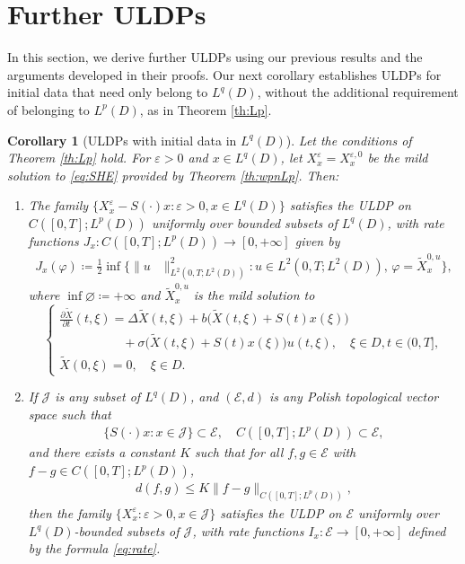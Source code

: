 \documentclass{amsart}
\theoremstyle{plain}
\theoremstyle{remark}
\theoremstyle{plain}
\newtheorem{corollary}[theorem]{Corollary}
\numberwithin{equation}{section}
\newcommand{\ceqq}{\coloneqq}
\newcommand{\col}{\colon}
\newcommand{\eps}{\varepsilon}
\begin{document}
\section{Further ULDPs}\label{sec:additionalULDPs}

In this section, we derive further ULDPs using our previous results and the arguments developed in their proofs. 
Our next  corollary establishes ULDPs for initial data that need only belong to $L^q(D)$, without the additional requirement of belonging to $L^p(D)$, as in Theorem \ref{th:Lp}.  

\begin{corollary}[ULDPs with initial data in $L^q(D)$]\label{cor:uldp pure Lq}  
Let the conditions of Theorem \ref{th:Lp} hold. For $\eps>0$ and $x\in L^q(D)$, let $X_x^{\eps}=X_x^{\eps,0}$ be the mild solution to \eqref{eq:SHE} provided by Theorem \ref{th:wpnLp}. Then:  
\begin{enumerate}
    \item 
    The family $\{X_x^{\eps}-S(\cdot)x:\eps>0,x\in L^q(D)\}$  satisfies the ULDP on $C([0,T];L^{p}(D))$  uniformly over bounded subsets of $L^q(D)$, with rate functions $J_x\col C([0,T];L^{p}(D))\to [0,+\infty]$ given by 
\begin{align*}
J_x(\varphi)\ceqq \frac12\inf\{\|u&\|_{L^2(0,T;L^2(D))}^2 : u\in L^2(0,T;L^2(D)),\, \varphi=\tilde X_x^{0,u} \}, 
\end{align*}
where $\inf\varnothing\ceqq +\infty$ and $\tilde X_x^{0,u}$ is the mild solution to 
\begin{equation*} 
\begin{cases}
\frac{\partial \tilde X}{\partial t}(t, \xi) = \Delta \tilde X(t, \xi) +b\big(\tilde X(t,\xi)+S(t)x(\xi)\big)\\
\qquad\qquad\quad+ \sigma\big(\tilde X(t, \xi)+S(t)x(\xi)\big)u(t,\xi), \quad  \xi \in D, t \in(0,T], \\ 
\tilde X(0, \xi) = 0, \quad\xi\in D.
\end{cases} 
\end{equation*}  
\item If $\mathcal{J}$ is any subset of $L^q(D)$, and $(\mathcal{E},d)$ is any Polish topological vector space such that 
\begin{align}\label{eq:E inclusionJ}
\{S(\cdot)x:x\in \mathcal{J}\}\subset \mathcal{E}, \quad
C([0,T];L^p(D))\subset \mathcal{E},    
\end{align}
and there exists a constant $K$ such that  for all $f,g\in \mathcal{E}$ with $f-g\in C([0,T];L^p(D))$,   
\begin{align}\label{eq:Lip metricJ}
d(f,g)\leq K\|f-g\|_{C([0,T];L^p(D))},  
\end{align} 
then the family  $\{X_x^{\eps} :\eps>0,x\in \mathcal{J}\}$  satisfies the ULDP on $\mathcal{E}$  uniformly over $L^q(D)$-bounded subsets of $\mathcal{J}$, with rate functions $I_x\col \mathcal{E}\to [0,+\infty]$ defined by the formula \eqref{eq:rate}. 
\end{enumerate}
\end{corollary}
\end{document}
